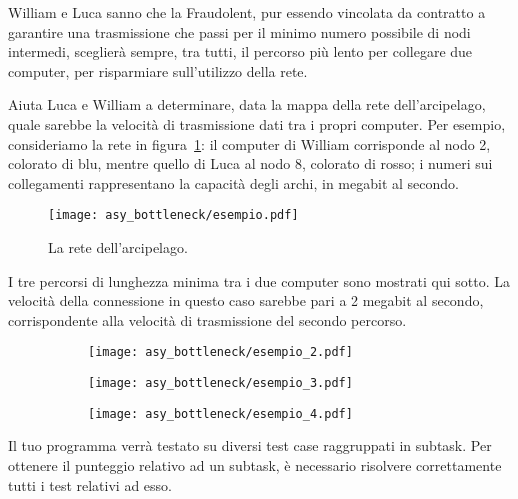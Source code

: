 William e Luca sanno che la Fraudolent, pur essendo vincolata da contratto a garantire una trasmissione che passi per il minimo numero possibile di nodi intermedi, sceglierà sempre, tra tutti, il percorso più lento per collegare due computer, per risparmiare sull'utilizzo della rete. 

Aiuta Luca e William a determinare, data la mappa della rete dell'arcipelago, quale sarebbe la velocità di trasmissione dati tra i propri computer. Per esempio, consideriamo la rete in figura~\ref{fig:esempio}: il computer di William corrisponde al nodo 2, colorato di blu, mentre quello di Luca al nodo 8, colorato di rosso; i numeri sui collegamenti rappresentano la capacità degli archi, in megabit al secondo.

\begin{figure}[h!]
	\centering\hspace*{2.5cm}\texttt{[image: asy\_bottleneck/esempio.pdf]}
	\caption{\label{fig:esempio}La rete dell'arcipelago.}
\end{figure}

I tre percorsi di lunghezza minima tra i due computer sono mostrati qui sotto. La velocità della connessione in questo caso sarebbe pari a 2 megabit al secondo, corrispondente alla velocità di trasmissione del secondo percorso.

\begin{figure}[H]
  \centering
  \begin{subfigure}[c]{0.30\textwidth}
    \centering\texttt{[image: asy\_bottleneck/esempio\_2.pdf]}
    \label{fig:percorso-1}
  \end{subfigure}
  \hfill
  \begin{subfigure}[c]{0.30\textwidth}
    \centering\texttt{[image: asy\_bottleneck/esempio\_3.pdf]}
    \label{fig:percorso-2}
  \end{subfigure}
  \hfill
  \begin{subfigure}[c]{0.30\textwidth}
    \centering\texttt{[image: asy\_bottleneck/esempio\_4.pdf]}
    \label{fig:percorso-3}
  \end{subfigure}
\end{figure}

\Scoring
Il tuo programma verrà testato su diversi test case raggruppati in subtask.
Per ottenere il punteggio relativo ad un subtask, è necessario risolvere
correttamente tutti i test relativi ad esso.

